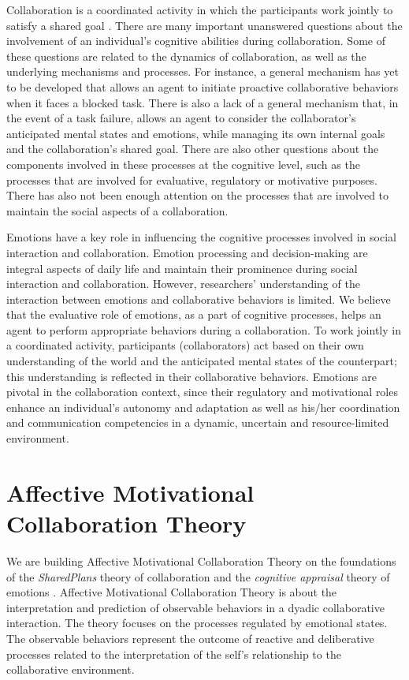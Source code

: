 \documentclass[letterpaper]{article}
\begin{document}
Collaboration is a coordinated activity in which the participants work jointly
to satisfy a shared goal \cite{grosz:plans-discourse}. There are many important
unanswered questions about the involvement of an individual's cognitive
abilities during collaboration. Some of these questions are related to the
dynamics of collaboration, as well as the underlying mechanisms and processes.
For instance, a general mechanism has yet to be developed that allows an agent
to initiate proactive collaborative behaviors when it faces a blocked task.
There is also a lack of a general mechanism that, in the event of a task
failure, allows an agent to consider the collaborator's anticipated mental
states and emotions, while managing its own internal goals and the
collaboration's shared goal. There are also other questions about the components
involved in these processes at the cognitive level, such as the processes that
are involved for evaluative, regulatory or motivative purposes. There has also
not been enough attention on the processes that are involved to maintain the
social aspects of a collaboration.

Emotions have a key role in influencing the cognitive processes involved in
social interaction and collaboration. Emotion processing and decision-making are
integral aspects of daily life and maintain their prominence during social
interaction and collaboration. However, researchers' understanding of the
interaction between emotions and collaborative behaviors is limited. We believe
that the evaluative role of emotions, as a part of cognitive processes, helps an
agent to perform appropriate behaviors during a collaboration. To work jointly
in a coordinated activity, participants (collaborators) act based on their own
understanding of the world and the anticipated mental states of the counterpart;
this understanding is reflected in their collaborative behaviors. Emotions are
pivotal in the collaboration context, since their regulatory and motivational
roles enhance an individual's autonomy and adaptation as well as his/her
coordination and communication competencies in a dynamic, uncertain and
resource-limited environment.

\vspace*{-3mm}
\section{Affective Motivational Collaboration Theory}

We are building Affective Motivational Collaboration Theory on the foundations
of the \textit{SharedPlans} theory of collaboration \cite{grosz:plans-discourse}
and the \textit{cognitive appraisal} theory of emotions
\cite{gratch:domain-independent}. Affective Motivational Collaboration Theory is
about the interpretation and prediction of observable behaviors in a dyadic
collaborative interaction. The theory focuses on the processes regulated by
emotional states. The observable behaviors represent the outcome of reactive and
deliberative processes related to the interpretation of the self's relationship
to the collaborative environment. 
\end{document}
